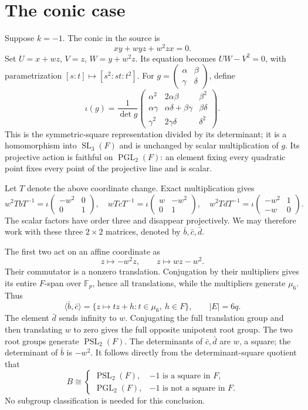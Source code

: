\documentclass[11pt,a4paper]{article}
\newcommand{\SL}{\operatorname{SL}}\newcommand{\PSL}{\operatorname{PSL}}
\newcommand{\PGL}{\operatorname{PGL}}\newcommand{\GL}{\operatorname{GL}}
\newcommand{\Fp}{\mathbb F_p}\newcommand{\PG}{\operatorname{PG}}
\begin{document}
\section{The conic case}
Suppose $k=-1$. The conic in the source is
\[
                       xy+w yz+w^2zx=0.
\]
Set $U=x+wz$, $V=z$, $W=y+w^2z$. Its equation becomes $UW-V^2=0$,
with parametrization $[s:t]\mapsto[s^2:st:t^2]$.
For $g=\begin{pmatrix}\alpha&\beta\\\gamma&\delta\end{pmatrix}$,
define
\[
 \iota(g)=\frac1{\det g}
 \begin{pmatrix}
 \alpha^2&2\alpha\beta&\beta^2\\
 \alpha\gamma&\alpha\delta+\beta\gamma&\beta\delta\\
 \gamma^2&2\gamma\delta&\delta^2
 \end{pmatrix}.
\]
This is the symmetric-square representation divided by its determinant;
it is a homomorphism into $\SL_3(F)$ and is unchanged by scalar
multiplication of $g$. Its projective action is faithful on
$\PGL_2(F)$: an element fixing every quadratic point fixes every
point of the projective line and is scalar.

Let $T$ denote the above coordinate change. Exact multiplication gives
\[
 w^2TbT^{-1}=\iota\begin{pmatrix}-w^2&0\\0&1\end{pmatrix},\quad
 wTcT^{-1}=\iota\begin{pmatrix}w&-w^2\\0&1\end{pmatrix},\quad
 w^2TdT^{-1}=\iota\begin{pmatrix}-w^2&1\\-w&0\end{pmatrix}.
\]
The scalar factors have order three and disappear projectively. We may
therefore work with these three $2\times2$ matrices, denoted by
$\bar b,\bar c,\bar d$.

The first two act on an affine coordinate as
\[
                        z\mapsto-w^2z,\qquad z\mapsto wz-w^2.
\]
Their commutator is a nonzero translation. Conjugation by their
multipliers gives its entire $F$-span over $\Fp$, hence all
translations, while the multipliers generate $\mu_6$. Thus
\begin{equation}\label{eq:affine}
 \langle\bar b,\bar c\rangle
 =\{z\mapsto tz+h:t\in\mu_6,\ h\in F\},\qquad |E|=6q.
\end{equation}
The element $\bar d$ sends infinity to $w$. Conjugating the full
translation group and then translating $w$ to zero gives the full
opposite unipotent root group. The two root groups generate
$\PSL_2(F)$. The determinants of $\bar c,\bar d$ are $w$, a square;
the determinant of $\bar b$ is $-w^2$. It follows directly from the
determinant-square quotient that
\[
 B\cong\begin{cases}
 \PSL_2(F),&-1\text{ is a square in }F,\\
 \PGL_2(F),&-1\text{ is not a square in }F.
 \end{cases}
\]
No subgroup classification is needed for this conclusion.
\end{document}
